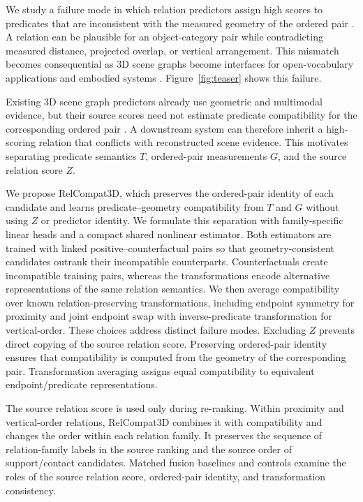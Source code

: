 We study a failure mode in which relation predictors assign high scores to predicates that are inconsistent with the measured geometry of the ordered pair \cite{nguyen2026relwitness,neau2026visual}. A relation can be plausible for an object-category pair while contradicting measured distance, projected overlap, or vertical arrangement. This mismatch becomes consequential as 3D scene graphs become interfaces for open-vocabulary applications and embodied systems \cite{koch2024open3dsg,hou2025fross,zhang2025open,wang2025open,saxena2025zing,fei2026open,madhavaram2026vizor}. Figure~\ref{fig:teaser} shows this failure.

Existing 3D scene graph predictors already use geometric and multimodal evidence, but their source scores need not estimate predicate compatibility for the corresponding ordered pair \cite{wald2020learning,zhang2021exploiting,feng20233d,wang2023vl,koch2024sgrec3d,chen2024clip}. A downstream system can therefore inherit a high-scoring relation that conflicts with reconstructed scene evidence. This motivates separating predicate semantics $T$, ordered-pair measurements $G$, and the source relation score $Z$.

We propose RelCompat3D, which preserves the ordered-pair identity of each candidate and learns predicate--geometry compatibility from $T$ and $G$ without using $Z$ or predictor identity. We formulate this separation with family-specific linear heads and a compact shared nonlinear estimator. Both estimators are trained with linked positive--counterfactual pairs so that geometry-consistent candidates outrank their incompatible counterparts. Counterfactuals create incompatible training pairs, whereas the transformations encode alternative representations of the same relation semantics. We then average compatibility over known relation-preserving transformations, including endpoint symmetry for proximity and joint endpoint swap with inverse-predicate transformation for vertical-order. These choices address distinct failure modes. Excluding $Z$ prevents direct copying of the source relation score. Preserving ordered-pair identity ensures that compatibility is computed from the geometry of the corresponding pair. Transformation averaging assigns equal compatibility to equivalent endpoint/predicate representations. 

The source relation score is used only during re-ranking. Within proximity and vertical-order relations, RelCompat3D combines it with compatibility and changes the order within each relation family. It preserves the sequence of relation-family labels in the source ranking and the source order of support/contact candidates. Matched fusion baselines and controls examine the roles of the source relation score, ordered-pair identity, and transformation consistency. 

